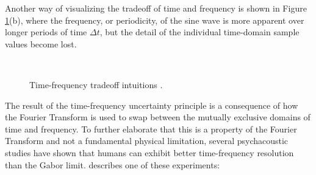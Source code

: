 \documentclass[report.tex]{subfiles}
\begin{document}
Another way of visualizing the tradeoff of time and frequency is shown in Figure \ref{fig:gaborfirst}(b), where the frequency, or periodicity, of the sine wave is more apparent over longer periods of time $\Delta t$, but the detail of the individual time-domain sample values become lost.

\begin{figure}[ht]
	\centering
	\\
	\caption{Time-frequency tradeoff intuitions \parencite[103, 106]{gabor2}.}
	\label{fig:gaborfirst}
\end{figure}

The result of the time-frequency uncertainty principle is a consequence of how the Fourier Transform is used to swap between the mutually exclusive domains of time and frequency. To further elaborate that this is a property of the Fourier Transform and not a fundamental physical limitation, several psychacoustic studies have shown that humans can exhibit better time-frequency resolution than the Gabor limit. \citeauthor{psycho2} describes one of these experiments:
\end{document}
